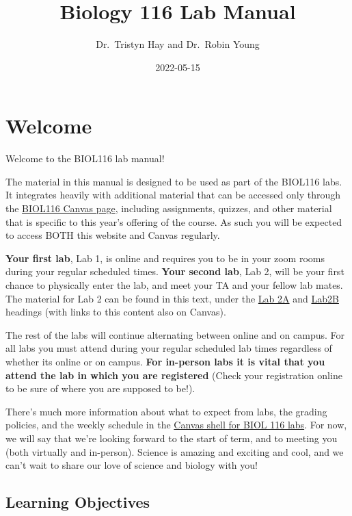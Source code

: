\documentclass[
]{book}
\title{Biology 116 Lab Manual}
\author{Dr.~Tristyn Hay and Dr.~Robin Young}
\date{2022-05-15}
\begin{document}
\maketitle

{
\setcounter{tocdepth}{1}
\tableofcontents
}
\hypertarget{welcome}{%
\chapter*{Welcome}\label{welcome}}

Welcome to the BIOL116 lab manual!

The material in this manual is designed to be used as part of the BIOL116 labs. It integrates heavily with additional material that can be accessed only through the \href{https://canvas.ubc.ca/courses/94572}{BIOL116 Canvas page}, including assignments, quizzes, and other material that is specific to this year's offering of the course. As such you will be expected to access BOTH this website and Canvas regularly.

\textbf{Your first lab}, Lab 1, is online and requires you to be in your zoom rooms during your regular scheduled times. \textbf{Your second lab}, Lab 2, will be your first chance to physically enter the lab, and meet your TA and your fellow lab mates. The material for Lab 2 can be found in this text, under the \href{https://ubco-biology.github.io/BIOL-116-Lab-Manual/the-process-of-science.html}{Lab 2A} and \href{https://ubco-biology.github.io/BIOL-116-Lab-Manual/research-project.html}{Lab2B} headings (with links to this content also on Canvas).

The rest of the labs will continue alternating between online and on campus. For all labs you must attend during your regular scheduled lab times regardless of whether its online or on campus. \textbf{For in-person labs it is vital that you attend the lab in which you are registered} (Check your registration online to be sure of where you are supposed to be!).

There's much more information about what to expect from labs, the grading policies, and the weekly schedule in the \href{https://canvas.ubc.ca}{Canvas shell for BIOL 116 labs}. For now, we will say that we're looking forward to the start of term, and to meeting you (both virtually and in-person). Science is amazing and exciting and cool, and we can't wait to share our love of science and biology with you!

\hypertarget{learning-objectives}{%
\section*{Learning Objectives}\label{learning-objectives}}
\end{document}
